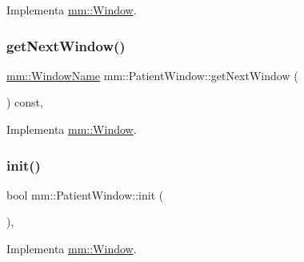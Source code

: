 Implementa \mbox{\hyperlink{classmm_1_1_window_a942c9125bf42156a9f7b7f561e412fed}{mm\+::\+Window}}.

\mbox{\label{classmm_1_1_patient_window_ae22b9bce4c7ccdbcc45feb080088a558}} 
\subsubsection{\texorpdfstring{get\+Next\+Window()}{getNextWindow()}}
{\footnotesize\ttfamily \mbox{\hyperlink{namespacemm_a4e9d92e04f65dbf2fc1963947da0d93c}{mm\+::\+Window\+Name}} mm\+::\+Patient\+Window\+::get\+Next\+Window (\begin{DoxyParamCaption}{ }\end{DoxyParamCaption}) const\hspace{0.3cm}{\ttfamily [override]}, {\ttfamily [virtual]}}



Implementa \mbox{\hyperlink{classmm_1_1_window_a0cd7b4b0feb9505c44503547a161fcd8}{mm\+::\+Window}}.

\mbox{\label{classmm_1_1_patient_window_a0ad27245769b095559858eeecdbb7089}} 
\subsubsection{\texorpdfstring{init()}{init()}}
{\footnotesize\ttfamily bool mm\+::\+Patient\+Window\+::init (\begin{DoxyParamCaption}{ }\end{DoxyParamCaption})\hspace{0.3cm}{\ttfamily [override]}, {\ttfamily [virtual]}}



Implementa \mbox{\hyperlink{classmm_1_1_window_aba03fbf4761b2f106352baecf5996e10}{mm\+::\+Window}}.

\mbox{\label{classmm_1_1_patient_window_a461de186f72a8902a9f95a622dc1c02b}} 
